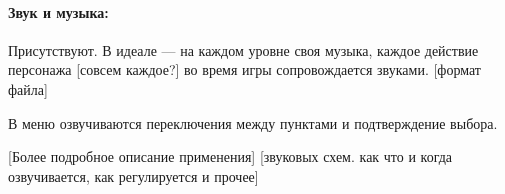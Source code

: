 \documentclass[12pt,a4paper]{article}
\begin{document}
\paragraph{Звук и музыка:}
Присутствуют. В идеале --- на каждом уровне своя музыка, каждое действие персонажа {\color{red} [совсем каждое?]}\ans{[Да]} во время игры сопровождается звуками.{\color{red} [формат файла]}

В меню озвучиваются переключения между пунктами и подтверждение выбора.

{\color{red} [Более подробное описание применения]}
 {\color{red} [звуковых схем. как что и когда озвучивается, как регулируется и прочее]}
\end{document}
